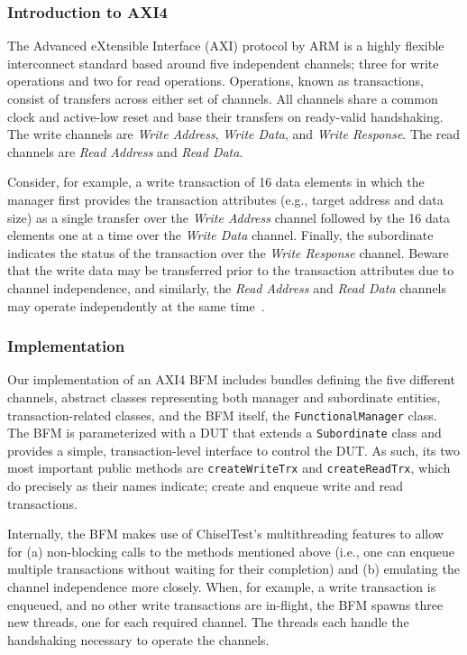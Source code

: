 \documentclass[conference]{IEEEtran}
\begin{document}
\subsubsection{Introduction to AXI4}
The Advanced eXtensible Interface (AXI) protocol by ARM is a highly flexible interconnect standard based around five independent channels; three for write operations and two for read operations. Operations, known as transactions, consist of transfers across either set of channels. All channels share a common clock and active-low reset and base their transfers on ready-valid handshaking. The write channels are \textit{Write Address}, \textit{Write Data}, and \textit{Write Response}. The read channels are \textit{Read Address} and \textit{Read Data}.

Consider, for example, a write transaction of 16 data elements in which the manager first provides the transaction attributes (e.g., target address and data size) as a single transfer over the \textit{Write Address} channel followed by the 16 data elements one at a time over the \textit{Write Data} channel. Finally, the subordinate indicates the status of the transaction over the \textit{Write Response} channel. Beware that the write data may be transferred prior to the transaction attributes due to channel independence, and similarly, the \textit{Read Address} and \textit{Read Data} channels may operate independently at the same time~\cite{axi4standard}.

\subsubsection{Implementation}
Our implementation of an AXI4 BFM includes bundles defining the five different channels, abstract classes representing both manager and subordinate entities, transaction-related classes, and the BFM itself, the \texttt{FunctionalManager} class. The BFM is parameterized with a DUT that extends a \texttt{Subordinate} class and provides a simple, transaction-level interface to control the DUT. As such, its two most important public methods are \texttt{createWriteTrx} and \texttt{createReadTrx}, which do precisely as their names indicate; create and enqueue write and read transactions.

Internally, the BFM makes use of ChiselTest's multithreading features to allow for (a) non-blocking calls to the methods mentioned above (i.e., one can enqueue multiple transactions without waiting for their completion) and (b) emulating the channel independence more closely. When, for example, a write transaction is enqueued, and no other write transactions are in-flight, the BFM spawns three new threads, one for each required channel. The threads each handle the handshaking necessary to operate the channels.
\end{document}
